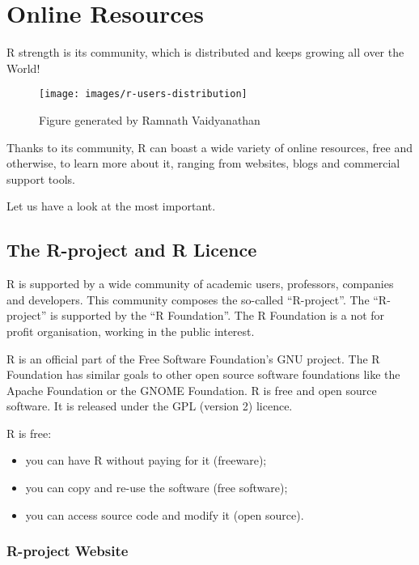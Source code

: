 \documentclass[]{book}
\providecommand{\tightlist}{%
  \setlength{\itemsep}{0pt}\setlength{\parskip}{0pt}}
\def\tightlist{}
\begin{document}
\chapter{Online Resources}\label{online-resources}

R strength is its community, which is distributed and keeps growing all
over the World!

\begin{figure}[h]

{\centering \texttt{[image: images/r-users-distribution]} 

}

\caption{Figure generated by Ramnath Vaidyanathan}\label{fig:g1}
\end{figure}

Thanks to its community, R can boast a wide variety of online resources,
free and otherwise, to learn more about it, ranging from websites, blogs
and commercial support tools.

Let us have a look at the most important.

\section{The R-project and R Licence}\label{the-r-project-and-r-licence}

R is supported by a wide community of academic users, professors,
companies and developers. This community composes the so-called
``R-project''. The ``R-project'' is supported by the ``R Foundation''.
The R Foundation is a not for profit organisation, working in the public
interest.

R is an official part of the Free Software Foundation's GNU project. The
R Foundation has similar goals to other open source software foundations
like the Apache Foundation or the GNOME Foundation. R is free and open
source software. It is released under the GPL (version 2) licence.

R is free:

\begin{itemize}
\tightlist
\item
  you can have R without paying for it (freeware);
\item
  you can copy and re-use the software (free software);
\item
  you can access source code and modify it (open source).
\end{itemize}

\subsection{R-project Website}\label{r-project-website}
\end{document}
